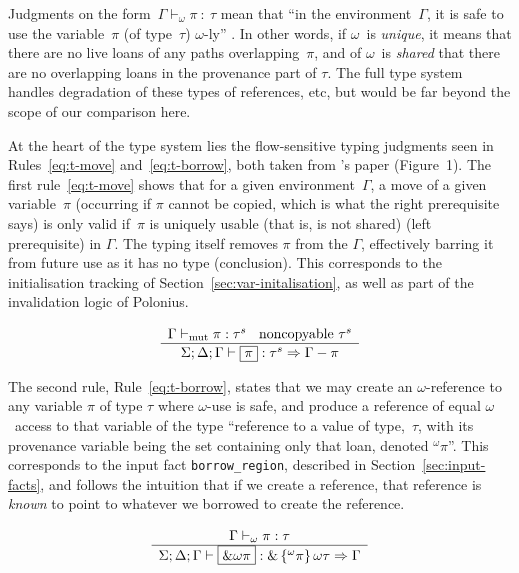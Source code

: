 \documentclass[11pt,a4paper,twoside,openany]{report}
\newcommand{\InDatalog}[1]{\texttt{#1}}
\newcommand{\expression}[1]{\boxed{#1}}
\newcommand{\ntyperule}[2]{\begin{array}{c}#1\\\hline\raisebox{1pt}{\strut}#2\end{array}}
\begin{document}
Judgments on the form~$\Gamma \vdash_{\omega} \pi \: : \: \tau$ mean that ``in
the environment~$\Gamma$, it is safe to use the variable~$\pi$ (of type~$\tau$)
$\omega$-ly'' \cite{weiss_oxide:_2019}. In other words, if $\omega$~is
\emph{unique}, it means that there are no live loans of any paths
overlapping~$\pi$, and of $\omega$~is \emph{shared} that there are no
overlapping loans in the provenance part of $\tau$. The full type system handles
degradation of these types of references, etc, but would be far beyond the scope
of our comparison here.

At the heart of the type system lies the flow-sensitive typing judgments seen in
Rules~\ref{eq:t-move} and~\ref{eq:t-borrow}, both taken from
\citeauthor*{weiss_oxide:_2019}'s paper (Figure~1). The first
rule~\eqref{eq:t-move} shows that for a given environment~$\Gamma$, a move of a
given variable~$\pi$ (occurring if $\pi$ cannot be copied, which is what the
right prerequisite says) is only valid if~$\pi$ is uniquely usable (that is, is
not shared) (left prerequisite) in $\Gamma$. The typing itself removes $\pi$
from the $\Gamma$, effectively barring it from future use as it has no type
(conclusion). This corresponds to the initialisation tracking of
Section~\ref{sec:var-initalisation}, as well as part of the invalidation logic
of Polonius.

\begin{equation}\label{eq:t-move}
  \ntyperule{
    \Gamma \vdash_{\text{mut}} \pi : \tau^s \:\:\:\:
    \text{noncopyable } \tau^s}
  {
    \Sigma ; \Delta ; \Gamma \vdash \expression{\pi} : \tau^s \Rightarrow \Gamma - \pi
  }
\end{equation}

The second rule, Rule~\eqref{eq:t-borrow}, states that we may create an
$\omega$-reference to any variable $\pi$ of type $\tau$ where $\omega$-use is
safe, and produce a reference of equal $\omega$~access to that variable of the
type ``reference to a value of type,~$\tau$, with its provenance variable being
the set containing only that loan, denoted $^{\omega}\pi$''. This corresponds to
the input fact \InDatalog{borrow_region}, described in
Section~\ref{sec:input-facts}, and follows the intuition that if we create a
reference, that reference is \emph{known} to point to whatever we borrowed to
create the reference.

\begin{equation}\label{eq:t-borrow}
  \ntyperule{
    \Gamma \vdash_{\omega} \pi : \tau}
  {
    \Sigma ; \Delta ; \Gamma \vdash \expression{\&\omega \pi} : \& \left \{ ^{\omega}\pi\right \} \omega \tau \Rightarrow \Gamma
  }
\end{equation}
\end{document}
